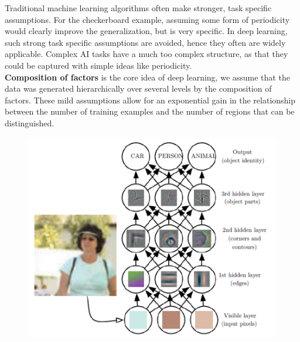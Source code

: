 \begin{multicols}{2}
	Traditional machine learning algorithms often make stronger, task specific assumptions.
	For the checkerboard example, assuming some form of periodicity would clearly improve the generalization, but is very specific.
	In deep learning, such strong task specific assumptions are avoided, hence they often are widely applicable.
	Complex AI tasks have a much too complex structure, as that they could be captured with simple ideas like periodicity.\\

	\textbf{Composition of factors} is the core idea of deep learning, we assume that the data was generated hierarchically over several levels by the composition of factors.
	These mild assumptions allow for an exponential gain in the relationship between the number of training examples and the number of regions that can be distinguished.
	\begin{figure}[H]
		\centering
		\includegraphics[width=0.75\linewidth]{images/whut.PNG}
	\end{figure}


\end{multicols}
